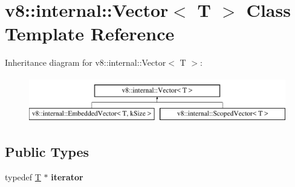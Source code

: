 \hypertarget{classv8_1_1internal_1_1Vector}{}\section{v8\+:\+:internal\+:\+:Vector$<$ T $>$ Class Template Reference}
\label{classv8_1_1internal_1_1Vector}
Inheritance diagram for v8\+:\+:internal\+:\+:Vector$<$ T $>$\+:\begin{figure}[H]
\begin{center}
\leavevmode
\includegraphics[height=2.000000cm]{classv8_1_1internal_1_1Vector}
\end{center}
\end{figure}
\subsection*{Public Types}
\begin{DoxyCompactItemize}
\item 
\mbox{\label{classv8_1_1internal_1_1Vector_a4eb1bff96066fd7324ceb3a5c78a58de}} 
typedef \mbox{\hyperlink{classv8_1_1internal_1_1torque_1_1T}{T}} $\ast$ {\bfseries iterator}
\end{DoxyCompactItemize}
